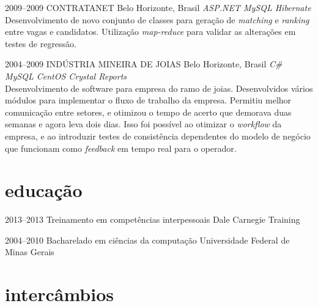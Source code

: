 \documentclass[]{friggeri-cv}
\begin{document}
\begin{entrylist}
\entry
{2009--2009}
{CONTRATANET}
{Belo Horizonte, Brasil}
{\emph{\bullet ASP.NET \bullet MySQL \bullet Hibernate } \\ Desenvolvimento de novo conjunto de classes para geração de \textit{matching} e \textit{ranking} entre vagas e candidatos. Utilização \textit{map-reduce} para validar as alterações em testes de regressão. }


%
 \entry
 {2004--2009}
 {INDÚSTRIA MINEIRA DE JOIAS}
 {Belo Horizonte, Brasil}
 {\emph{\bullet C\# \bullet MySQL \bullet CentOS \bullet Crystal Reports } \\ Desenvolvimento de software para empresa do ramo de joias. Desenvolvidos vários módulos para implementar o fluxo de trabalho da empresa. Permitiu melhor comunicação entre setores, e otimizou o tempo de acerto que demorava duas semanas e agora leva dois dias. Isso foi possível ao otimizar o \textit{workflow} da empresa, e ao introduzir testes de consistência dependentes do modelo de negócio que funcionam como \textit{feedback} em tempo real para o operador.}
%

\end{entrylist}



\section{educação}

\begin{entrylist}


\entry
{2013--2013}
{Treinamento {\normalfont em competências interpessoais}}
{Dale Carnegie Training}

\entry
{2004--2010}
{Bacharelado {\normalfont em ciências da computação}}
{Universidade Federal de Minas Gerais}



\end{entrylist}


\section{intercâmbios} 
\end{document}
